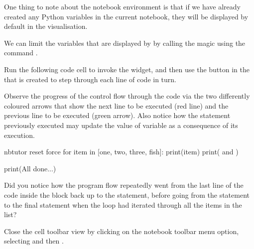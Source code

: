 \documentclass[letterpaper,10pt,english]{sphinxmanual}
\begin{document}
One thing to note about the notebook environment is that if we have already created any Python variables in the current notebook, they will be displayed by default in the  visualisation.

We can limit the variables that are displayed by  by calling the magic using the command .

Run the following code cell to invoke the  widget, and then use the  button in the  that is created to step through each line of code in turn.

Observe the progress of the control flow through the code via the two differently coloured arrows that show the next line to be executed (red line) and the previous line to be executed (green arrow). Also notice how the statement previously executed may update the value of  variable as a consequence of its execution.

{
\begin{sphinxVerbatim}[commandchars=\\\{\}]
\llap{\color{nbsphinxin}[ ]:\,\hspace{\fboxrule}\hspace{\fboxsep}}\PYGZpc{}\PYGZpc{}nbtutor \PYGZhy{}\PYGZhy{}reset \PYGZhy{}\PYGZhy{}force
for item in [\PYGZsq{}one\PYGZsq{}, \PYGZsq{}two\PYGZsq{}, \PYGZsq{}three\PYGZsq{}, \PYGZsq{}fish\PYGZsq{}]:
    print(item)
    print(\PYGZsq{} and \PYGZsq{})

print(\PYGZsq{}All done...\PYGZsq{})
\end{sphinxVerbatim}
}

Did you notice how the program flow repeatedly went from the last line of the code inside the  block back up to the  statement, before going from the  statement to the final  statement when the loop had iterated through all the items in the list?

Close the  cell toolbar view by clicking on the notebook toolbar  menu option, selecting  and then .
\end{document}

